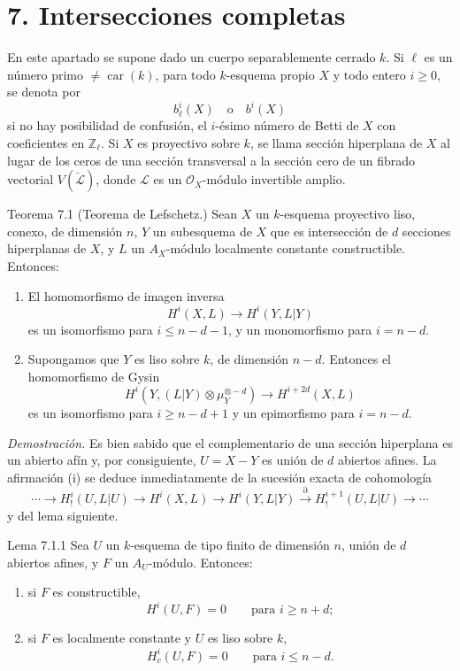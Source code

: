 \section*{7. Intersecciones completas}

En este apartado se supone dado un cuerpo separablemente cerrado $k$. Si $\ell$ es un número primo $\ne\operatorname{car}(k)$, para todo $k$-esquema propio $X$ y todo entero $i\ge0$, se denota por
\[
b_\ell^i(X)\quad\text{o}\quad b^i(X)
\]
si no hay posibilidad de confusión, el $i$-ésimo número de Betti de $X$ con coeficientes en $\mathbb Z_\ell$. Si $X$ es proyectivo sobre $k$, se llama sección hiperplana de $X$ al lugar de los ceros de una sección transversal a la sección cero de un fibrado vectorial $V(\check{\mathcal L})$, donde $\mathcal L$ es un $\mathcal O_X$-módulo invertible amplio.

\begin{statement}{Teorema 7.1}
(Teorema de Lefschetz.) Sean $X$ un $k$-esquema proyectivo liso, conexo, de dimensión $n$, $Y$ un subesquema de $X$ que es intersección de $d$ secciones hiperplanas de $X$, y $L$ un $A_X$-módulo localmente constante constructible. Entonces:
\begin{enumerate}[label=(\roman*)]
\item El homomorfismo de imagen inversa
\[
H^i(X,L)\to H^i(Y,L|Y)
\]
es un isomorfismo para $i\le n-d-1$, y un monomorfismo para $i=n-d$.
\item Supongamos que $Y$ es liso sobre $k$, de dimensión $n-d$. Entonces el homomorfismo de Gysin
\[
H^i(Y,(L|Y)\otimes\mu_Y^{\otimes -d})\to H^{i+2d}(X,L)
\]
es un isomorfismo para $i\ge n-d+1$ y un epimorfismo para $i=n-d$.
\end{enumerate}
\end{statement}

\emph{Demostración.} Es bien sabido que el complementario de una sección hiperplana es un abierto afín y, por consiguiente, $U=X-Y$ es unión de $d$ abiertos afines. La afirmación (i) se deduce inmediatamente de la sucesión exacta de cohomología
\[
\cdots\to H_!^i(U,L|U)\to H^i(X,L)\to H^i(Y,L|Y)
\xrightarrow{\partial} H_!^{i+1}(U,L|U)\to\cdots
\]
y del lema siguiente.

\begin{statement}{Lema 7.1.1}
Sea $U$ un $k$-esquema de tipo finito de dimensión $n$, unión de $d$ abiertos afines, y $F$ un $A_U$-módulo. Entonces:
\begin{enumerate}[label=\alph*)]
\item si $F$ es constructible,
\[
H^i(U,F)=0\qquad\text{para }i\ge n+d;
\]
\item si $F$ es localmente constante y $U$ es liso sobre $k$,
\[
H^i_c(U,F)=0\qquad\text{para }i\le n-d.
\]
\end{enumerate}
\end{statement}
